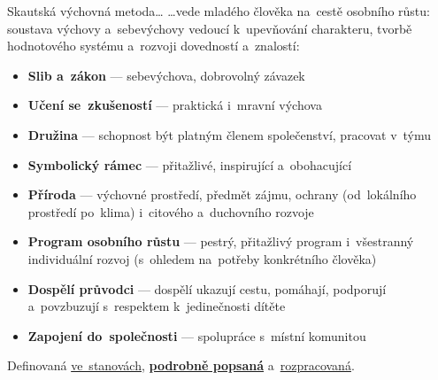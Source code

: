 \documentclass[compress, xelatex, 11pt, xcolor=dvipsnames, aspectratio=169, url={hyphens, lowtilde}]{beamer}
\begin{document}
\begin{frame}{Skautská výchovná metoda\ldots}
	\ldots vede mladého člověka na~cestě osobního růstu: soustava výchovy a~sebevýchovy vedoucí k~upevňování charakteru, tvorbě hodnotového systému a~rozvoji dovedností a~znalostí:
	\begin{itemize}
		\item \textbf{Slib a~zákon} --- sebevýchova, dobrovolný závazek
		\item \textbf{Učení se~zkušeností} --- praktická i~mravní výchova
		\item \textbf{Družina} --- schopnost být platným členem společenství, pracovat v~týmu
		\item \textbf{Symbolický rámec} --- přitažlivé, inspirující a~obohacující
		\item \textbf{Příroda} --- výchovné prostředí, předmět zájmu, ochrany (od~lokálního prostředí po~klima) i~citového a~duchovního rozvoje
		\item \textbf{Program osobního růstu} --- pestrý, přitažlivý program i~všestranný individuální rozvoj (s~ohledem na~potřeby konkrétního člověka)
		\item \textbf{Dospělí průvodci} --- dospělí ukazují cestu, pomáhají, podporují a~povzbuzují s~respektem k~jedinečnosti dítěte
		\item \textbf{Zapojení do~společnosti} --- spolupráce s~místní komunitou
	\end{itemize}
	Definovaná \href{https://krizovatka.skaut.cz/spisovna/stanovy-junaka-ceskeho-skauta}{ve~stanovách}, \href{https://krizovatka.skaut.cz/vedu-oddil/skautska-vychova/skautska-vychovna-metoda}{\textbf{podrobně popsaná}} a~\href{https://krizovatka.skaut.cz/vedu-oddil/skautska-vychova}{rozpracovaná}.
\end{frame}
\end{document}
